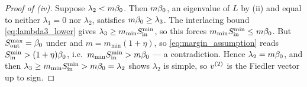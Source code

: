 \begin{proof}[Proof of (iv)]
Suppose $\lambda_2<m\beta_0$. Then $m\beta_0$, an eigenvalue of $L$ by
(ii) and equal to neither $\lambda_1=0$ nor $\lambda_2$, satisfies
$m\beta_0\ge\lambda_3$. The interlacing bound \eqref{eq:lambda3_lower} gives
$\lambda_3\ge m_{\min}S_{\mathrm{in}}^{\min}$, so this forces $m_{\min}S_{\mathrm{in}}^{\min}\le m\beta_0$.
But $S_{\mathrm{out}}^{\max}=\beta_0$ under  and $m=m_{\min}(1+\eta)$, so
\eqref{eq:margin_assumption} reads $S_{\mathrm{in}}^{\min}>(1+\eta)\beta_0$, i.e.\
$m_{\min}S_{\mathrm{in}}^{\min}>m\beta_0$ --- a contradiction. Hence $\lambda_2=m\beta_0$, and then
$\lambda_3\ge m_{\min}S_{\mathrm{in}}^{\min}>m\beta_0=\lambda_2$ shows $\lambda_2$ is simple, so
$v^{(2)}$ is the Fiedler vector up to sign.
\end{proof}
